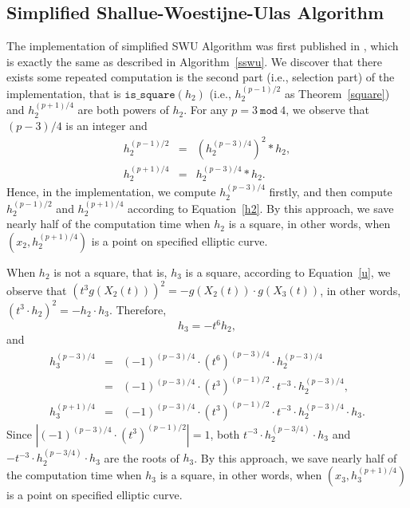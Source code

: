 \subsection{Simplified Shallue-Woestijne-Ulas Algorithm}
The implementation of simplified SWU Algorithm was first published in 
\cite{brier2010efficient}, which is exactly the same as described in
Algorithm~\ref{sswu}. We discover that there exists some repeated computation is the
second part (i.e., selection part) of the implementation, that is
$\texttt{is\_square}(h_2)$ (i.e., $h_2 ^ {(p-1)/2}$ as Theorem~\ref{square})
and $h_2 ^ {(p+1)/4}$ are both powers of $h_2$.
For any $p = 3\ \texttt{mod}\ 4$, we observe that $(p-3)/4$ is an integer
and
\begin{equation}
\label{h2}
\begin{array}{lll}
h_2^{(p-1)/2} & = & (h_2^{(p-3)/4})^2 * h_2, \\
h_2^{(p+1)/4} & = & h_2^{(p-3)/4} * h_2.
\end{array}
\end{equation}
Hence, in the implementation, we compute $h_2^{(p-3)/4}$ firstly, and then
compute $h_2^{(p-1)/2}$ and $h_2^{(p+1)/4}$ according to Equation~\ref{h2}. 
By this approach, we save nearly half of the computation time when $h_2$ is a
square, in other words, when $(x_2, h_2^{(p+1)/4})$ is a point on specified elliptic curve.

\par When $h_2$ is not a square, that is, $h_3$ is a square, according to
Equation~\ref{u}, we observe that
$(t^3g(X_2(t)))^2 = -g(X_2(t)) \cdot g(X_3(t))$,
in other words,
$(t^3 \cdot h_2)^2 = -h_2 \cdot h_3$. 
Therefore,
\begin{equation}
h_3  =  -t^6h_2,
\end{equation}
and
\begin{equation}
\label{h3}
\begin{array}{lll}
h_3^{(p-3)/4} & = & (-1)^{(p-3)/4} \cdot (t^6)^{(p-3)/4} \cdot h_2^{(p-3)/4}\\
& = & (-1)^{(p-3)/4} \cdot (t^3)^{(p-1)/2} \cdot t^{-3} \cdot h_2^{(p-3)/4},\\
h_3^{(p+1)/4} & = & (-1)^{(p-3)/4} \cdot (t^3)^{(p-1)/2} \cdot t^{-3} \cdot
h_2^{(p-3)/4} \cdot h_3.
\end{array}
\end{equation}
Since $|(-1)^{(p-3)/4} \cdot (t^3)^{(p-1)/2}|=1$, both 
$t^{-3} \cdot h_2^{(p-3/4)} \cdot h_3$ and
$-t^{-3} \cdot h_2^{(p-3/4)} \cdot h_3$ are the roots of $h_3$. 
By this approach, we save nearly half of the computation time when $h_3$ is  a
square, in other words, when $(x_3, h_3^{(p+1)/4})$ is a point on specified elliptic curve.


